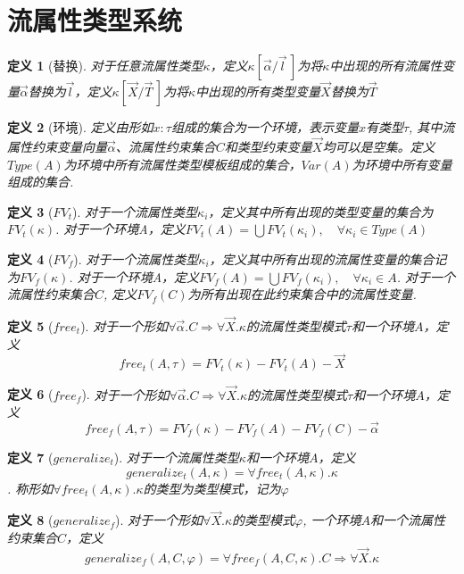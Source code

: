 \documentclass[UTF8, colorlinks]{pkuthss}
\newtheorem{definition}{定义}
\begin{document}
\section{流属性类型系统}
	\begin{definition}[替换]
		对于任意流属性类型$\kappa$，定义$\kappa[\vec{\alpha}/\vec{l}\,]$为将$\kappa$中出现的所有流属性变量$\vec{\alpha}$替换为$\vec{l}$，定义$\kappa[\vec{X}/\vec{T}\,]$为将$\kappa$中出现的所有类型变量$\vec{X}$替换为$\vec{T}$
	\end{definition}
	\begin{definition}[环境]
		定义由形如$x:\tau$组成的集合为一个环境，表示变量$x$有类型$\tau$, 其中流属性约束变量向量$\vec{\alpha}$、流属性约束集合$C$和类型约束变量$\vec{X}$均可以是空集。定义$Type(A)$为环境中所有流属性类型模板组成的集合，$Var(A)$为环境中所有变量组成的集合.
	\end{definition}
	\begin{definition}[$FV_t$]
		对于一个流属性类型$\kappa_i$，定义其中所有出现的类型变量的集合为$FV_t(\kappa)$. 对于一个环境A，定义$FV_t(A) = \bigcup FV_t(\kappa_i),\quad \forall\kappa_i\in Type(A)$
	\end{definition}
	\begin{definition}[$FV_f$]
		对于一个流属性类型$\kappa_i$，定义其中所有出现的流属性变量的集合记为$FV_f(\kappa)$. 对于一个环境A，定义$FV_f(A) = \bigcup FV_f(\kappa_i),\quad \forall\kappa_i\in A$. 对于一个流属性约束集合$C$, 定义$FV_f(C)$为所有出现在此约束集合中的流属性变量.
	\end{definition}
	\begin{definition}[$free_t$]
		对于一个形如$\forall\vec{\alpha}.C\Rightarrow \forall\vec{X}.\kappa$的流属性类型模式$\tau$和一个环境$A$，定义$$free_t(A, \tau) = FV_t(\kappa) - FV_t(A) - \vec{X}$$
	\end{definition}
	\begin{definition}[$free_f$]
		对于一个形如$\forall\vec{\alpha}.C\Rightarrow \forall\vec{X}.\kappa$的流属性类型模式$\tau$和一个环境$A$，定义$$free_f(A, \tau) = FV_f(\kappa) - FV_f(A) - FV_f(C) - \vec{\alpha}$$
	\end{definition}
	\begin{definition}[$generalize_t$]
		对于一个流属性类型$\kappa$和一个环境$A$，定义$$generalize_t(A, \kappa) = \forall free_t(A, \kappa).\kappa$$. 称形如$\forall free_t(A, \kappa).\kappa$的类型为类型模式，记为$\varphi$
	\end{definition}
	\begin{definition}[$generalize_f$]
		对于一个形如$\forall\vec{X}.\kappa$的类型模式$\varphi$, 一个环境$A$和一个流属性约束集合$C$，定义$$generalize_f(A, C, \varphi) = \forall free_f(A, C, \kappa).C\Rightarrow\forall\vec{X}.\kappa$$
	\end{definition}
\end{document}
